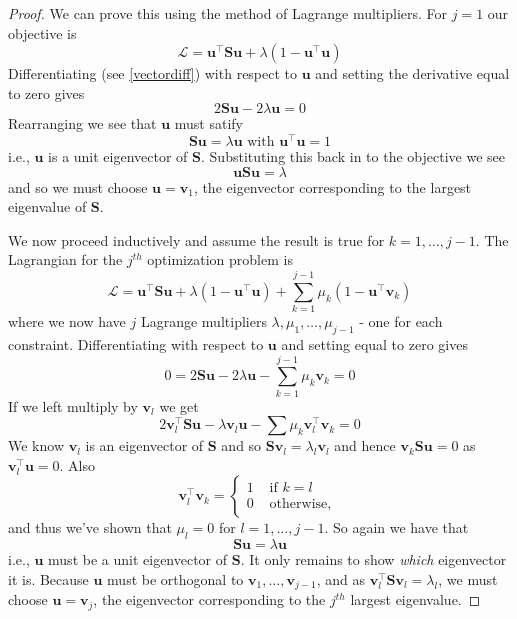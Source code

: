 \documentclass[]{book}
\theoremstyle{definition}
\theoremstyle{definition}
\theoremstyle{definition}
\theoremstyle{remark}
\begin{document}
\begin{proof}
{}We can prove this using the method of Lagrange multipliers. For \(j=1\) our objective is
\[\mathcal{L} = \boldsymbol u^\top  \boldsymbol S\boldsymbol u+\lambda(1-\boldsymbol u^\top \boldsymbol u)\]
Differentiating (see \ref{vectordiff}) with respect to \(\boldsymbol u\) and setting the derivative equal to zero gives
\[2\boldsymbol S\boldsymbol u-2\lambda \boldsymbol u=0\]
Rearranging we see that \(\boldsymbol u\) must satify
\[\boldsymbol S\boldsymbol u=\lambda \boldsymbol u\mbox{ with } \boldsymbol u^\top \boldsymbol u=1\]
i.e., \(\boldsymbol u\) is a unit eigenvector of \(\boldsymbol S\). Substituting this back in to the objective we see
\[\boldsymbol u\boldsymbol S\boldsymbol u= \lambda\]
and so we must choose \(\boldsymbol u=\boldsymbol v_1\), the eigenvector corresponding to the largest eigenvalue of \(\boldsymbol S\).

We now proceed inductively and assume the result is true for \(k=1, \ldots, j-1\). The Lagrangian for the \(j^{th}\) optimization problem is
\[\mathcal{L} = \boldsymbol u^\top  \boldsymbol S\boldsymbol u+\lambda(1-\boldsymbol u^\top \boldsymbol u) +\sum_{k=1}^{j-1}\mu_k (1-\boldsymbol u^\top \boldsymbol v_k)\]
where we now have \(j\) Lagrange multipliers \(\lambda, \mu_1, \ldots, \mu_{j-1}\) - one for each constraint.
Differentiating with respect to \(\boldsymbol u\) and setting equal to zero gives
\[0 = 2\boldsymbol S\boldsymbol u- 2\lambda \boldsymbol u- \sum_{k=1}^{j-1} \mu_k\boldsymbol v_k=0 \]
If we left multiply by \(\boldsymbol v_l\) we get
\[2\boldsymbol v_l^\top \boldsymbol S\boldsymbol u- \lambda \boldsymbol v_l \boldsymbol u- \sum \mu_k \boldsymbol v_l^\top \boldsymbol v_k =0\]
We know \(\boldsymbol v_l\) is an eigenvector of \(\boldsymbol S\) and so \(\boldsymbol S\boldsymbol v_l=\lambda_l \boldsymbol v_l\) and hence \(\boldsymbol v_k \boldsymbol S\boldsymbol u=0\) as \(\boldsymbol v_l^\top \boldsymbol u=0\). Also \[\boldsymbol v_l^\top\boldsymbol v_k=\begin{cases}1 &\mbox{ if } k=l\\
0 &\mbox{ otherwise, }\end{cases}\] and thus we've shown that \(\mu_l=0\) for \(l=1, \ldots, j-1\). So again we have that \[\boldsymbol S\boldsymbol u= \lambda \boldsymbol u\]
i.e., \(\boldsymbol u\) must be a unit eigenvector of \(\boldsymbol S\). It only remains to show \emph{which} eigenvector it is. Because \(\boldsymbol u\) must be orthogonal to \(\boldsymbol v_1, \ldots, \boldsymbol v_{j-1}\),
and as \(\boldsymbol v_l^\top \boldsymbol S\boldsymbol v_l = \lambda_l\), we must choose \(\boldsymbol u=\boldsymbol v_j\), the eigenvector corresponding to the \(j^{th}\) largest eigenvalue.
\end{proof}
\end{document}
